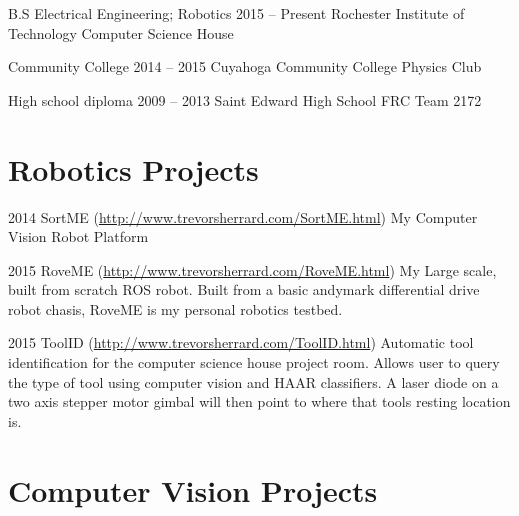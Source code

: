 \documentclass{tccv}
\begin{document}
\begin{yearlist}

\item[B.S Electrical Engineering; Robotics]{2015 -- Present}
     {Rochester Institute of Technology}
     {Computer Science House}
     
\item[Community College]{2014 -- 2015}
     {Cuyahoga Community College}
     {Physics Club}
     
\item[High school diploma]{2009 -- 2013}
     {Saint Edward High School}
     {FRC Team 2172}

\end{yearlist}


\section{Robotics Projects}

\begin{yearlist}

\item{2014}
     {SortME (\href{http://www.trevorsherrard.com/SortME.html}{http://www.trevorsherrard.com\newline/SortME.html})}
     {My Computer Vision Robot Platform}
     
\item{2015}
     {RoveME (\href{http://www.trevorsherrard.com/RoveME.html}{http://www.trevorsherrard.com\newline/RoveME.html})}
     {My Large scale, built from scratch ROS robot. Built from a basic andymark differential drive robot chasis, RoveME is my personal robotics testbed.}
     
\item{2015}
	{ToolID (\href{http://www.trevorsherrard.com/ToolID.html}
	{http://www.trevorsherrard.com\newline/ToolID.html})}
	{Automatic tool identification for the computer science house project room. Allows user to query the type of tool using computer vision and HAAR classifiers. A laser diode on a two axis stepper motor gimbal will then point to where that tools resting location is.}
 

\end{yearlist}


\section{Computer Vision Projects}
\end{document}
